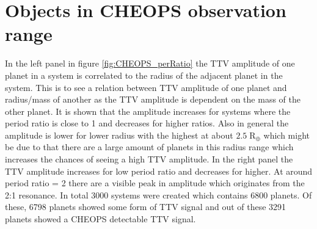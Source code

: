 \documentclass[12pt]{report}
\begin{document}
\section{Objects in CHEOPS observation range}
	In the left panel in figure \ref{fig:CHEOPS_perRatio} the TTV amplitude of one planet in a system is correlated to the radius of the adjacent planet in the system. This is to see a relation between TTV amplitude of one planet and radius/mass of another as the TTV amplitude is dependent on the mass of the other planet. It is shown that the amplitude increases for systems where the period ratio is close to 1 and decreases for higher ratios. Also in general the amplitude is lower for lower radius with the highest at about $2.5\; \mathrm{R_{\oplus}}$ which might be due to that there are a large amount of planets in this radius range which increases the chances of seeing a high TTV amplitude. In the right panel the TTV amplitude increases for low period ratio and decreases for higher. At around period ratio = 2 there are a visible peak in amplitude which originates from the 2:1 resonance. In total 3000 systems were created which contains 6800 planets. Of these, 6798 planets showed some form of TTV signal and out of these 3291 planets showed a CHEOPS detectable TTV signal.
	
\end{document}
